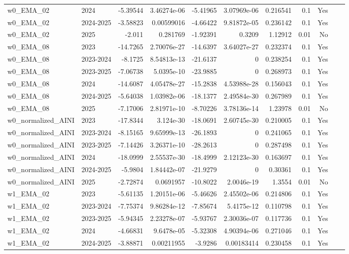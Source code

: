 \begin{longtable}{llrrrrrrrrl}
w0\_EMA\_02 & 2024 & -5.39544 & 3.46274e-06 & -5.41965 & 3.07969e-06 & 0.216541 & 0.1 & Yes \\
w0\_EMA\_02 & 2024-2025 & -3.58823 & 0.00599016 & -4.66422 & 9.81872e-05 & 0.236142 & 0.1 & Yes \\
w0\_EMA\_02 & 2025 & -2.011 & 0.281769 & -1.92391 & 0.3209 & 1.12912 & 0.01 & No \\
w0\_EMA\_08 & 2023 & -14.7265 & 2.70076e-27 & -14.6397 & 3.64027e-27 & 0.232374 & 0.1 & Yes \\
w0\_EMA\_08 & 2023-2024 & -8.1725 & 8.54813e-13 & -21.6137 & 0 & 0.238254 & 0.1 & Yes \\
w0\_EMA\_08 & 2023-2025 & -7.06738 & 5.0395e-10 & -23.9885 & 0 & 0.268973 & 0.1 & Yes \\
w0\_EMA\_08 & 2024 & -14.6087 & 4.05478e-27 & -15.2838 & 4.53988e-28 & 0.156043 & 0.1 & Yes \\
w0\_EMA\_08 & 2024-2025 & -5.64038 & 1.03982e-06 & -18.1377 & 2.49584e-30 & 0.267989 & 0.1 & Yes \\
w0\_EMA\_08 & 2025 & -7.17006 & 2.81971e-10 & -8.70226 & 3.78136e-14 & 1.23978 & 0.01 & No \\
w0\_normalized\_AINI & 2023 & -17.8344 & 3.124e-30 & -18.0691 & 2.60745e-30 & 0.210005 & 0.1 & Yes \\
w0\_normalized\_AINI & 2023-2024 & -8.15165 & 9.65999e-13 & -26.1893 & 0 & 0.241065 & 0.1 & Yes \\
w0\_normalized\_AINI & 2023-2025 & -7.14426 & 3.26371e-10 & -28.2613 & 0 & 0.287498 & 0.1 & Yes \\
w0\_normalized\_AINI & 2024 & -18.0999 & 2.55537e-30 & -18.4999 & 2.12123e-30 & 0.163697 & 0.1 & Yes \\
w0\_normalized\_AINI & 2024-2025 & -5.9804 & 1.84442e-07 & -21.9279 & 0 & 0.30361 & 0.1 & Yes \\
w0\_normalized\_AINI & 2025 & -2.72874 & 0.0691957 & -10.8022 & 2.0046e-19 & 1.3554 & 0.01 & No \\
w1\_EMA\_02 & 2023 & -5.61135 & 1.20151e-06 & -5.46626 & 2.45502e-06 & 0.214806 & 0.1 & Yes \\
w1\_EMA\_02 & 2023-2024 & -7.75374 & 9.86284e-12 & -7.85674 & 5.4175e-12 & 0.110798 & 0.1 & Yes \\
w1\_EMA\_02 & 2023-2025 & -5.94345 & 2.23278e-07 & -5.93767 & 2.30036e-07 & 0.117736 & 0.1 & Yes \\
w1\_EMA\_02 & 2024 & -4.66831 & 9.6478e-05 & -5.32308 & 4.90394e-06 & 0.271046 & 0.1 & Yes \\
w1\_EMA\_02 & 2024-2025 & -3.88871 & 0.00211955 & -3.9286 & 0.00183414 & 0.230458 & 0.1 & Yes \\

\end{longtable}
